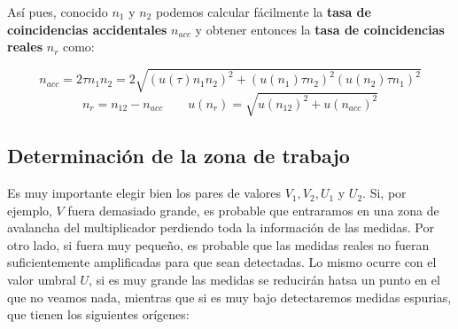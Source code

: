 \documentclass[11pt]{article}
\begin{document}
Así pues, conocido $n_1$ y $n_2$ podemos calcular fácilmente la \textbf{tasa de coincidencias accidentales} $n_{acc}$ y obtener entonces la \textbf{tasa de coincidencias reales} $n_r$ como:

\begin{equation}
	n_{acc} = 2 \tau n_1 n_2 = 2\sqrt{(u({\tau})n_1n_2)^2 + (u(n_{1})\tau n_2)^2  (u(n_{2})\tau n_1)^2 }
\end{equation}
\begin{equation}
	n_r = n_{12} - n_{acc} \qquad u(n_r) = \sqrt{u(n_{12})^2 + u(n_{acc})^2}
\end{equation}

\subsection{Determinación de la zona de trabajo} \label{Subsec:zona_trabajo}

Es muy importante elegir bien los pares de valores $V_1,V_2,U_1$ y $U_2$. Si, por ejemplo, $V$ fuera demasiado grande, es probable que entraramos en una zona de avalancha del multiplicador perdiendo toda la información de las medidas. Por otro lado, si fuera muy pequeño, es probable que las medidas reales no fueran suficientemente amplificadas para que sean detectadas. Lo mismo ocurre con el valor umbral $U$, si es muy grande las medidas se reducirán hatsa un punto en el que no veamos nada, mientras que si es muy bajo detectaremos medidas espurias, que tienen los siguientes orígenes: 
\end{document}
